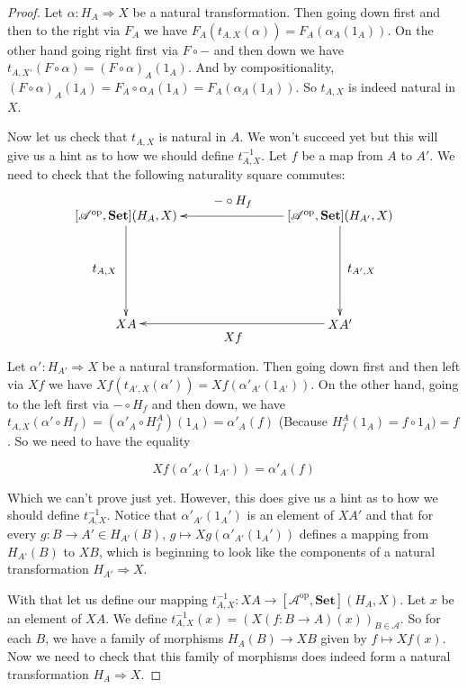 \documentclass[11pt]{article}
\theoremstyle{definition}
\theoremstyle{definition}
\theoremstyle{plain}
\theoremstyle{plain}
\theoremstyle{plain}
\begin{document}
\begin{proof}
Let $\alpha:H_A \Rightarrow X$ be a natural transformation. Then going down first and then to the right via $F_A$ we have $F_A(t_{A,X}(\alpha)) = F_A(\alpha_A(1_A))$. On the other hand going right first via $F \circ -$ and then down we have $t_{A,X'}(F \circ \alpha) = (F \circ \alpha)_A(1_A)$. And by compositionality, $(F \circ \alpha)_A(1_A) = F_A \circ \alpha_A(1_A) = F_A(\alpha_A(1_A))$. So $t_{A,X}$ is indeed natural in $X$.

Now let us check that $t_{A,X}$ is natural in $A$. We won't succeed yet but this will give us a hint as to how we should define $t_{A,X}^{-1}$. Let $f$ be a map from $A$ to $A'$. We need to check that the following naturality square commutes:

\begin{equation*}
\begin{xy}
(0,0)*+{[\mathscr{A}^{\text{op}},\textbf{Set}](H_A,X)}="v1"; (60,0)*+{[\mathscr{A}^{\text{op}},\textbf{Set}](H_{A'},X)}="v2"; (0,-30)*+{XA}="v3"; (60,-30)*+{XA'}="v4";
{\ar "v2";"v1"}?*!/^4mm/{- \circ H_f};
{\ar "v1";"v3"}?*!/^6mm/{t_{A,X}};
{\ar "v2";"v4"}?*!/_6mm/{t_{A',X}};
{\ar "v4";"v3"}?*!/_4mm/{Xf};
\end{xy}
\end{equation*}

Let $\alpha':H_{A'} \Rightarrow X$ be a natural transformation. Then going down first and then left via $Xf$ we have $Xf(t_{A',X}(\alpha')) = Xf(\alpha'_{A'}(1_{A'}))$. On the other hand, going to the left first via $- \circ H_f$ and then down, we have $t_{A,X}(\alpha' \circ H_f) = (\alpha'_{A} \circ H_f^A)(1_A)=\alpha'_{A}(f)$ (Because $H_f^A(1_A) = f \circ 1_A) = f$. So we need to have the equality

\begin{equation*}
Xf(\alpha'_{A'}(1_{A'})) = \alpha'_{A}(f)
\end{equation*}

Which we can't prove just yet. However, this does give us a hint as to how we should define $t_{A,X}^{-1}$. Notice that $\alpha'_{A'}(1_A')$ is an element of $XA'$ and that for every $g:B \to A' \in H_{A'}(B)$, $g \mapsto Xg(\alpha'_{A'}(1_A'))$ defines a mapping from $H_{A'}(B)$ to $XB$, which is beginning to look like the components of a natural transformation $H_{A'} \Rightarrow X$.

With that let us define our mapping $t_{A,X}^{-1}:XA \to [\mathscr{A}^{\text{op}}, \textbf{Set}](H_A,X)$. Let $x$ be an element of $XA$. We define $t_{A,X}^{-1}(x) = \left( X(f: B \to A)(x) \right)_{B \in \mathscr{A}}$. So for each $B$, we have a family of morphisms $H_A(B) \to XB$ given by $f \mapsto Xf(x)$. Now we need to check that this family of morphisms does indeed form a natural transformation $H_A \Rightarrow X$. 


\end{proof}
\end{document}
